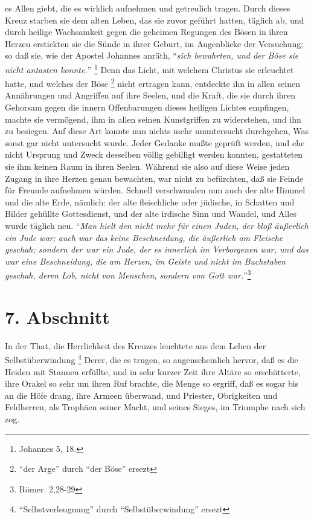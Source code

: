 es Allen giebt, die es wirklich aufnehmen und getreulich tragen. Durch dieses
Kreuz starben sie dem alten Leben, das sie zuvor geführt hatten, täglich ab, und
durch heilige Wachsamkeit gegen die geheimen Regungen des Bösen in ihren Herzen
erstickten sie die Sünde in ihrer Geburt, im Augenblicke der Versuchung; so daß
sie, wie der Apostel Johannes anräth, "`\textit{sich bewahrten, und der Böse sie
nicht antasten konnte.}"' \footnote{Johannes 5, 18.}
Denn das Licht, mit welchem Christus sie erleuchtet hatte, und welches der Böse
\footnote{"`der Arge"' durch "`der Böse"' ersezt}
nicht ertragen kann, entdeckte ihn in allen seinen Annährungen und Angriffen auf
ihre Seelen, und die Kraft, die sie durch ihren Gehorsam gegen die innern
Offenbarungen dieses heiligen Lichtes empfingen, machte sie vermögend, ihm in
allen seinen Kunstgriffen zu widerstehen, und ihn zu besiegen. Auf diese Art
konnte nun nichts mehr ununtersucht durchgehen, Was sonst gar nicht untersucht
wurde. Jeder Gedanke mußte geprüft werden, und ehe nicht Ursprung und Zweck
desselben völlig gebilligt werden konnten, gestatteten sie ihm keinen Raum in
ihren Seelen. Während sie also auf diese Weise jeden Zugang in ihre Herzen genau
bewachten, war nicht zu befürchten, daß sie Feinde für Freunde aufnehmen würden.
Schnell verschwanden nun auch der alte Himmel und die alte Erde, nämlich: der
alte fleischliche oder jüdische, in Schatten und Bilder gehüllte Gottesdienst,
und der alte irdische Sinn und Wandel, und Alles wurde täglich neu.
"`\textit{Man hielt
den nicht mehr für einen Juden, der bloß äußerlich ein Jude war; auch war das
keine Beschneidung, die äußerlich am Fleische geschah; sondern der war ein Jude,
der es innerlich im Verborgenen war, und das war eine Beschneidung, die am
Herzen, im Geiste und nicht im Buchstaben geschah, deren Lob, nicht von
Menschen, sondern von Gott war.}"'\footnote{Römer. 2,28-29}

\section{7. Abschnitt}

In der That, die Herrlichkeit des Kreuzes leuchtete aus dem Leben der
Selbstüberwindung \footnote{"`Selbstverleugnung"' durch "`Selbstüberwindung"'
ersezt} Derer, die es trugen, so augenscheinlich hervor, daß es die
Heiden mit Staunen erfüllte, und in sehr kurzer Zeit ihre Altäre so
erschütterte, ihre Orakel so sehr um ihren Ruf brachte, die Menge so ergriff,
daß es sogar bis an die Höfe drang, ihre Armeen überwand, und Priester,
Obrigkeiten und Feldherren, als Trophäen seiner Macht, und seines Sieges, im
Triumphe nach sich zog.

